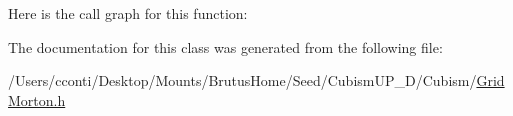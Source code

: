 Here is the call graph for this function\+:




The documentation for this class was generated from the following file\+:\begin{DoxyCompactItemize}
\item 
/\+Users/cconti/\+Desktop/\+Mounts/\+Brutus\+Home/\+Seed/\+Cubism\+U\+P\+\_\+D/\+Cubism/\hyperlink{_grid_morton_8h}{Grid\+Morton.\+h}\end{DoxyCompactItemize}
